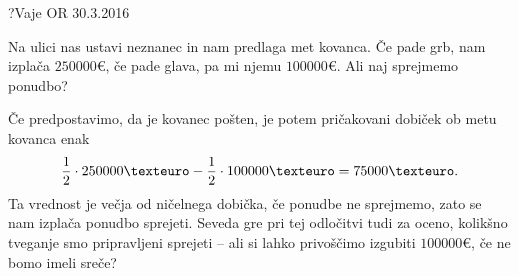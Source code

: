
\begin{naloga}{?}{Vaje OR 30.3.2016}
\begin{vprasanje}[kovanec]
Na ulici nas ustavi neznanec in nam predlaga met kovanca.
Če pade grb, nam izplača $250000 €$,
če pade glava, pa mi njemu $100000 €$.
Ali naj sprejmemo ponudbo?
\end{vprasanje}

\begin{odgovor}
Če predpostavimo, da je kovanec pošten,
je potem pričakovani dobiček ob metu kovanca enak
$$
{1 \over 2} \cdot 250000 € - {1 \over 2} \cdot 100000 € = 75000 € .
$$
Ta vrednost je večja od ničelnega dobička, če ponudbe ne sprejmemo,
zato se nam izplača ponudbo sprejeti.
Seveda gre pri tej odločitvi tudi za oceno,
kolikšno tveganje smo pripravljeni sprejeti
-- ali si lahko privoščimo izgubiti $100000 €$, če ne bomo imeli sreče?
\end{odgovor}
\end{naloga}


